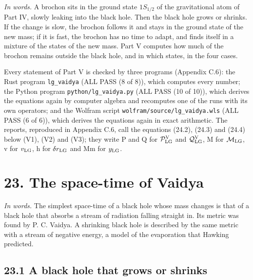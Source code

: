 \documentclass[
  10pt,
]{article}
\begin{document}
\emph{In words.} A brochon sits in the ground state \(1S_{1/2}\) of the
gravitational atom of Part IV, slowly leaking into the black hole. Then
the black hole grows or shrinks. If the change is slow, the brochon
follows it and stays in the ground state of the new mass; if it is fast,
the brochon has no time to adapt, and finds itself in a mixture of the
states of the new mass. Part V computes how much of the brochon remains
outside the black hole, and in which states, in the four cases.

Every statement of Part V is checked by three programs (Appendix C.6):
the Rust program \texttt{lg\_vaidya} (ALL PASS (8 of 8)), which computes
every number; the Python program \texttt{python/lg\_vaidya.py} (ALL PASS
(10 of 10)), which derives the equations again by computer algebra and
recomputes one of the runs with its own operators; and the Wolfram
script \texttt{wolfram/source/lg\_vaidya.wls} (ALL PASS (6 of 6)), which
derives the equations again in exact arithmetic. The reports, reproduced
in Appendix C.6, call the equations (24.2), (24.3) and (24.4) below
(V1), (V2) and (V3); they write P and Q for
\(\mathcal P^{\rm V}_{\rm LG}\) and \(\mathcal Q^{\rm V}_{\rm LG}\), M
for \(\mathcal M_{\rm LG}\), v for \(v_{\rm LG}\), h for
\(\delta r_{\rm LG}\) and Mm for \(y_{\rm LG}\).

\hypertarget{the-space-time-of-vaidya}{%
\section{23. The space-time of Vaidya}\label{the-space-time-of-vaidya}}

\emph{In words.} The simplest space-time of a black hole whose mass
changes is that of a black hole that absorbs a stream of radiation
falling straight in. Its metric was found by P. C. Vaidya. A shrinking
black hole is described by the same metric with a stream of negative
energy, a model of the evaporation that Hawking predicted.

\hypertarget{a-black-hole-that-grows-or-shrinks}{%
\subsection{23.1 A black hole that grows or
shrinks}\label{a-black-hole-that-grows-or-shrinks}}
\end{document}
